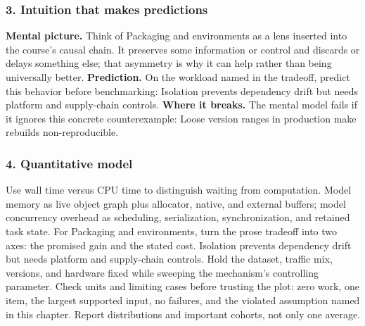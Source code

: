 \subsubsection*{3. Intuition that makes predictions}
\textbf{Mental picture.} Think of Packaging and environments as a lens inserted into the course's causal chain. It preserves some information or control and discards or delays something else; that asymmetry is why it can help rather than being universally better.
\textbf{Prediction.} On the workload named in the tradeoff, predict this behavior before benchmarking: Isolation prevents dependency drift but needs platform and supply-chain controls.
\textbf{Where it breaks.} The mental model fails if it ignores this concrete counterexample: Loose version ranges in production make rebuilds non-reproducible.
\subsubsection*{4. Quantitative model}
Use wall time versus CPU time to distinguish waiting from computation. Model memory as live object graph plus allocator, native, and external buffers; model concurrency overhead as scheduling, serialization, synchronization, and retained task state.
For Packaging and environments, turn the prose tradeoff into two axes: the promised gain and the stated cost. Isolation prevents dependency drift but needs platform and supply-chain controls. Hold the dataset, traffic mix, versions, and hardware fixed while sweeping the mechanism's controlling parameter.
Check units and limiting cases before trusting the plot: zero work, one item, the largest supported input, no failures, and the violated assumption named in this chapter. Report distributions and important cohorts, not only one average.
